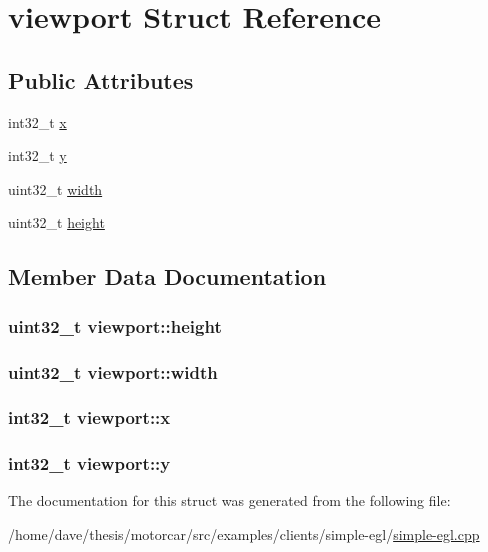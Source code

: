 \hypertarget{structviewport}{\section{viewport Struct Reference}
\label{structviewport}
}
\subsection*{Public Attributes}
\begin{DoxyCompactItemize}
\item 
int32\-\_\-t \hyperlink{structviewport_af15859b95160fdbce837547c585f2aec}{x}
\item 
int32\-\_\-t \hyperlink{structviewport_a9ffe59cc8a2c8fe2a101362a0465897e}{y}
\item 
uint32\-\_\-t \hyperlink{structviewport_a136ab41404efc11ad2654b0de7378886}{width}
\item 
uint32\-\_\-t \hyperlink{structviewport_a9a2d0b0eb58b9da4e40b435383406b65}{height}
\end{DoxyCompactItemize}


\subsection{Member Data Documentation}
\hypertarget{structviewport_a9a2d0b0eb58b9da4e40b435383406b65}{
\subsubsection[{height}]{\setlength{\rightskip}{0pt plus 5cm}uint32\-\_\-t viewport\-::height}}\label{structviewport_a9a2d0b0eb58b9da4e40b435383406b65}
\hypertarget{structviewport_a136ab41404efc11ad2654b0de7378886}{
\subsubsection[{width}]{\setlength{\rightskip}{0pt plus 5cm}uint32\-\_\-t viewport\-::width}}\label{structviewport_a136ab41404efc11ad2654b0de7378886}
\hypertarget{structviewport_af15859b95160fdbce837547c585f2aec}{
\subsubsection[{x}]{\setlength{\rightskip}{0pt plus 5cm}int32\-\_\-t viewport\-::x}}\label{structviewport_af15859b95160fdbce837547c585f2aec}
\hypertarget{structviewport_a9ffe59cc8a2c8fe2a101362a0465897e}{
\subsubsection[{y}]{\setlength{\rightskip}{0pt plus 5cm}int32\-\_\-t viewport\-::y}}\label{structviewport_a9ffe59cc8a2c8fe2a101362a0465897e}


The documentation for this struct was generated from the following file\-:\begin{DoxyCompactItemize}
\item 
/home/dave/thesis/motorcar/src/examples/clients/simple-\/egl/\hyperlink{simple-egl_8cpp}{simple-\/egl.\-cpp}\end{DoxyCompactItemize}
